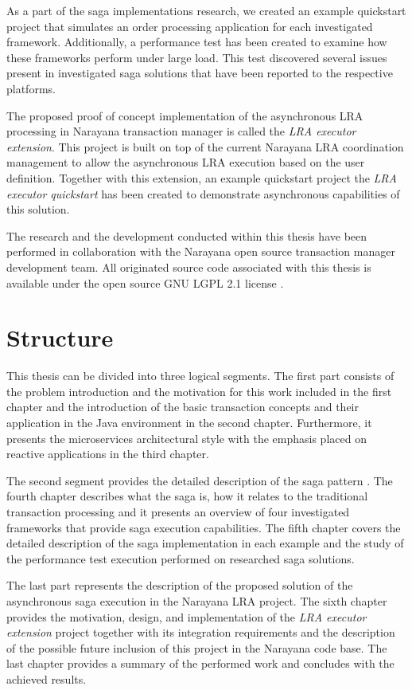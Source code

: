 \documentclass[oneside,
  digital, %
  table,   %
  lof,     %
  lot,     %
]{fithesis3}
\begin{document}
As a part of the saga implementations research, we created an example quickstart project that simulates an order processing application for each investigated framework. Additionally, a performance test has been created to examine how these frameworks perform under large load. This test discovered several issues present in investigated saga solutions that have been reported to the respective platforms.

The proposed proof of concept implementation of the asynchronous LRA processing in Narayana transaction manager is called the \textit{LRA executor extension}. This project is built on top of the current Narayana LRA coordination management to allow the asynchronous LRA execution based on the user definition. Together with this extension, an example quickstart project the \textit{LRA executor quickstart} has been created to demonstrate asynchronous capabilities of this solution.

The research and the development conducted within this thesis have been performed in collaboration with the Narayana open source transaction manager \cite{narayana} development team. All originated source code associated with this thesis is available under the open source GNU LGPL 2.1 license \cite{gnuLGPL21}.

\section{Structure}

This thesis can be divided into three logical segments. The first part consists of the problem introduction and the motivation for this work included in the first chapter and the introduction of the basic transaction concepts and their application in the Java environment in the second chapter. Furthermore, it presents the microservices architectural style with the emphasis placed on reactive applications in the third chapter.

The second segment provides the detailed description of the saga pattern \cite{sagas_publ}. The fourth chapter describes what the saga is, how it relates to the traditional transaction processing and it presents an overview of four investigated frameworks that provide saga execution capabilities. The fifth chapter covers the detailed description of the saga implementation in each example and the study of the performance test execution performed on researched saga solutions.

The last part represents the description of the proposed solution of the asynchronous saga execution in the Narayana LRA project. The sixth chapter provides the motivation, design, and implementation of the \textit{LRA executor extension} project together with its integration requirements and the description of the possible future inclusion of this project in the Narayana code base. The last chapter provides a summary of the performed work and concludes with the achieved results.
\end{document}
